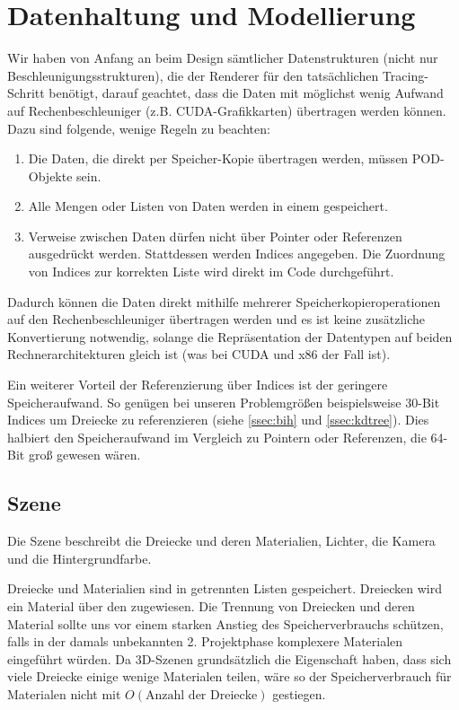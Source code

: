 \section{Datenhaltung und Modellierung}

Wir haben von Anfang an beim Design sämtlicher Datenstrukturen (nicht nur Beschleunigungsstrukturen), die der Renderer für den tatsächlichen Tracing-Schritt benötigt, darauf geachtet, dass die Daten mit möglichst wenig Aufwand auf Rechenbeschleuniger (z.B. CUDA-Grafikkarten) übertragen werden können. Dazu sind folgende, wenige Regeln zu beachten:

\begin{enumerate}
\item Die Daten, die direkt per Speicher-Kopie übertragen werden, müssen POD-Objekte sein.
\item Alle Mengen oder Listen von Daten werden in einem  gespeichert.
\item Verweise zwischen Daten dürfen nicht über Pointer oder Referenzen ausgedrückt werden. Stattdessen werden Indices angegeben. Die Zuordnung von Indices zur korrekten Liste wird direkt im Code durchgeführt.
\end{enumerate}

Dadurch können die Daten direkt mithilfe mehrerer Speicherkopieroperationen auf den Rechenbeschleuniger übertragen werden und es ist keine zusätzliche Konvertierung notwendig, solange die Repräsentation der Datentypen auf beiden Rechnerarchitekturen gleich ist (was bei CUDA und x86 der Fall ist).

Ein weiterer Vorteil der Referenzierung über Indices ist der geringere Speicheraufwand. So genügen bei unseren Problemgrößen beispielsweise 30-Bit Indices um Dreiecke zu referenzieren (siehe \ref{ssec:bih} und \ref{ssec:kdtree}). Dies halbiert den Speicheraufwand im Vergleich zu Pointern oder Referenzen, die 64-Bit groß gewesen wären.

\subsection{Szene}

Die Szene beschreibt die Dreiecke und deren Materialien, Lichter, die Kamera und die Hintergrundfarbe.

Dreiecke und Materialien sind in getrennten Listen gespeichert. Dreiecken wird ein Material über den  zugewiesen. Die Trennung von Dreiecken und deren Material sollte uns vor einem starken Anstieg des Speicherverbrauchs schützen, falls in der damals unbekannten 2. Projektphase komplexere Materialen eingeführt würden. Da 3D-Szenen grundsätzlich die Eigenschaft haben, dass sich viele Dreiecke einige wenige Materialen teilen, wäre so der Speicherverbrauch für Materialen nicht mit $O(\text{Anzahl der Dreiecke})$ gestiegen.

